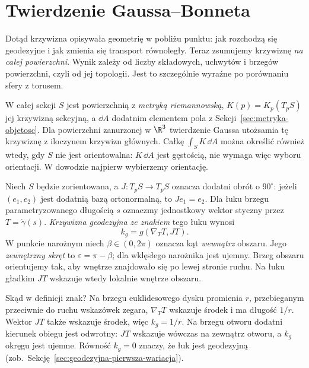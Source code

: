 \section{Twierdzenie Gaussa--Bonneta}
\label{sec:gauss-bonnet}

Dotąd krzywizna opisywała geometrię w pobliżu punktu:
jak rozchodzą się geodezyjne i jak zmienia się transport
równoległy. Teraz zsumujemy krzywiznę \emph{na całej
powierzchni}. Wynik zależy od liczby składowych, uchwytów
i brzegów powierzchni, czyli od jej topologii. Jest to
szczególnie wyraźne po porównaniu sfery z torusem.

W całej sekcji $S$ jest powierzchnią z \emph{metryką
riemannowską}, $K(p)=K_p(T_pS)$ jej krzywizną sekcyjną,
a $\dd A$ dodatnim elementem
pola z Sekcji~\ref{sec:metryka-objetosc}. Dla powierzchni
zanurzonej w $\R^3$ twierdzenie Gaussa utożsamia tę
krzywiznę z iloczynem krzywizn głównych.
Całkę $\int_S K\,\dd A$ można określić również wtedy,
gdy $S$ nie jest orientowalna: $K\,\dd A$ jest gęstością,
nie wymaga więc wyboru orientacji. W dowodzie najpierw
wybierzemy orientację.

\begin{definicja}
\label{def:krzywizna-geodezyjna}
Niech $S$ będzie zorientowana, a $J:T_pS\to T_pS$
oznacza dodatni obrót o $90^\circ$: jeżeli $(e_1,e_2)$
jest dodatnią bazą ortonormalną, to $Je_1=e_2$.
Dla łuku brzegu parametryzowanego długością $s$ oznaczmy
jednostkowy wektor styczny przez $T=\dot\gamma(s)$.
\emph{Krzywizna geodezyjna ze znakiem} tego łuku wynosi
\begin{equation}\label{eq:kg-def}
 k_g=g(\nabla_TT,JT).
\end{equation}
W punkcie narożnym niech $\beta\in(0,2\pi)$ oznacza
kąt \emph{wewnątrz} obszaru. Jego \emph{zewnętrzny skręt}
to $\varepsilon=\pi-\beta$; dla wklęsłego narożnika
jest ujemny. Brzeg obszaru orientujemy tak, aby wnętrze
znajdowało się po lewej stronie ruchu. Na łuku gładkim
$JT$ wskazuje wtedy lokalnie wnętrze obszaru.
\end{definicja}

Skąd w definicji znak? Na brzegu euklidesowego dysku
promienia $r$, przebieganym przeciwnie do ruchu wskazówek
zegara, $\nabla_TT$ wskazuje środek i ma długość $1/r$.
Wektor $JT$ także wskazuje środek, więc $k_g=1/r$.
Na brzegu otworu dodatni kierunek obiegu jest odwrotny:
$JT$ wskazuje wówczas na zewnątrz otworu, a $k_g$
okręgu jest ujemne. Równość $k_g=0$ znaczy, że łuk
jest geodezyjną (zob.\ Sekcję~\ref{sec:geodezyjna-pierwsza-wariacja}).

